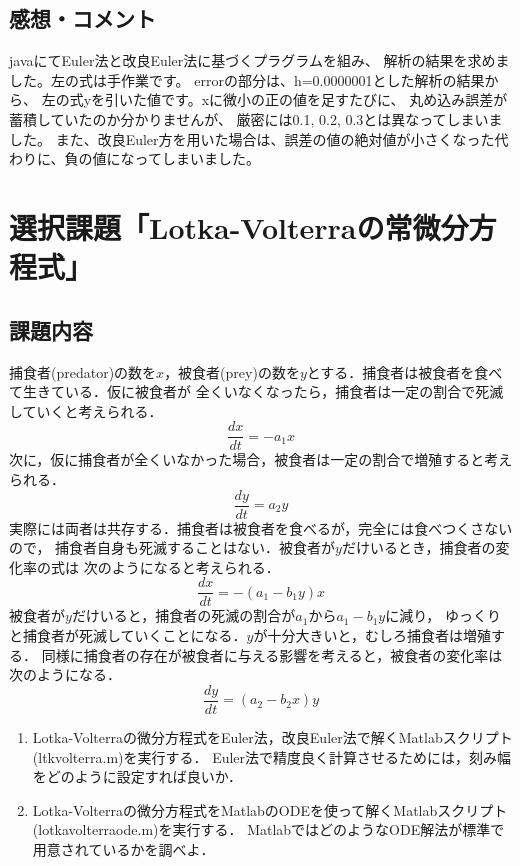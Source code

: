 \documentclass{jarticle}
\begin{document}
\newpage
\subsection{感想・コメント}
javaにてEuler法と改良Euler法に基づくプラグラムを組み、
解析の結果を求めました。左の式は手作業です。
errorの部分は、h=0.0000001とした解析の結果から、
左の式yを引いた値です。xに微小の正の値を足すたびに、
丸め込み誤差が蓄積していたのか分かりませんが、
厳密には0.1, 0.2, 0.3とは異なってしまいました。
また、改良Euler方を用いた場合は、誤差の値の絶対値が小さくなった代わりに、負の値になってしまいました。

\newpage
\section{選択課題「Lotka-Volterraの常微分方程式」}
\subsection{課題内容}
捕食者(predator)の数を$x$，被食者(prey)の数を$y$とする．捕食者は被食者を食べて生きている．仮に被食者が
全くいなくなったら，捕食者は一定の割合で死滅していくと考えられる．
$$
\frac{dx}{dt}=-a_1x
$$
次に，仮に捕食者が全くいなかった場合，被食者は一定の割合で増殖すると考えられる．
$$
\frac{dy}{dt}=a_2y
$$
実際には両者は共存する．捕食者は被食者を食べるが，完全には食べつくさないので，
捕食者自身も死滅することはない．被食者が$y$だけいるとき，捕食者の変化率の式は
次のようになると考えられる．
$$
\frac{dx}{dt}=-(a_1 - b_1y)x
$$
被食者が$y$だけいると，捕食者の死滅の割合が$a_1$から$a_1-b_1y$に減り，
ゆっくりと捕食者が死滅していくことになる．$y$が十分大きいと，むしろ捕食者は増殖する．
同様に捕食者の存在が被食者に与える影響を考えると，被食者の変化率は次のようになる．
$$
\frac{dy}{dt}=(a_2-b_2x)y
$$


\begin{enumerate}
\def\labelenumi{\theenumi)}
\def\theenumi{\arabic{enumi}}
\item Lotka-Volterraの微分方程式をEuler法，改良Euler法で解くMatlabスクリプト(ltkvolterra.m)を実行する．
Euler法で精度良く計算させるためには，刻み幅をどのように設定すれば良いか．
%
%
\item Lotka-Volterraの微分方程式をMatlabのODEを使って解くMatlabスクリプト(lotkavolterraode.m)を実行する．
MatlabではどのようなODE解法が標準で用意されているかを調べよ．
%
\end{enumerate}
\end{document}
